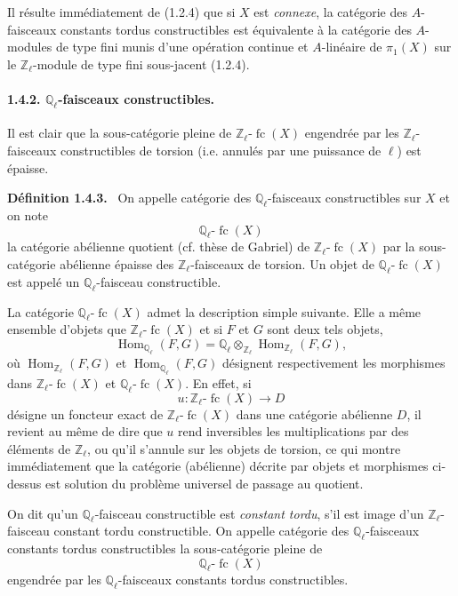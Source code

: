 \documentclass[11pt]{article}
\newenvironment{statement}[1]{\par\medskip\noindent\textbf{#1.}\ }{\par\medskip}
\DeclareMathOperator{\Hom}{Hom}
\providecommand{\Hom}{\operatorname{Hom}}
\providecommand{\fc}{\operatorname{fc}}
\providecommand{\Hom}{\operatorname{Hom}}
\begin{document}
Il résulte immédiatement de (1.2.4) que si \(X\) est \emph{connexe}, la catégorie des \(A\)-faisceaux constants tordus constructibles est équivalente à la catégorie des \(A\)-modules de type fini munis d'une opération continue et \(A\)-linéaire de \(\pi_1(X)\) sur le \(\mathbb Z_\ell\)-module de type fini sous-jacent (1.2.4).

\paragraph{1.4.2. \(\mathbb Q_\ell\)-faisceaux constructibles.}
Il est clair que la sous-catégorie pleine de \(\mathbb Z_\ell\text{-}\fc(X)\) engendrée par les \(\mathbb Z_\ell\)-faisceaux constructibles de torsion (i.e. annulés par une puissance de \(\ell\)) est épaisse.

\begin{statement}{Définition 1.4.3}
On appelle catégorie des \(\mathbb Q_\ell\)-faisceaux constructibles sur \(X\) et on note
\[
\mathbb Q_\ell\text{-}\fc(X)
\]
la catégorie abélienne quotient (cf. thèse de Gabriel) de \(\mathbb Z_\ell\text{-}\fc(X)\) par la sous-catégorie abélienne épaisse des \(\mathbb Z_\ell\)-faisceaux de torsion. Un objet de \(\mathbb Q_\ell\text{-}\fc(X)\) est appelé un \(\mathbb Q_\ell\)-faisceau constructible.
\end{statement}

La catégorie \(\mathbb Q_\ell\text{-}\fc(X)\) admet la description simple suivante. Elle a même ensemble d'objets que \(\mathbb Z_\ell\text{-}\fc(X)\) et si \(F\) et \(G\) sont deux tels objets,
\[
\Hom_{\mathbb Q_\ell}(F,G)
=\mathbb Q_\ell\otimes_{\mathbb Z_\ell}\Hom_{\mathbb Z_\ell}(F,G),
\]
où \(\Hom_{\mathbb Z_\ell}(F,G)\) et \(\Hom_{\mathbb Q_\ell}(F,G)\)
désignent respectivement les morphismes dans \(\mathbb Z_\ell\text{-}\fc(X)\) et \(\mathbb Q_\ell\text{-}\fc(X)\). En effet, si
\[
u:\mathbb Z_\ell\text{-}\fc(X)\longrightarrow D
\]
désigne un foncteur exact de \(\mathbb Z_\ell\text{-}\fc(X)\) dans une catégorie abélienne \(D\), il revient au même de dire que \(u\) rend inversibles les multiplications par des éléments de \(\mathbb Z_\ell\), ou qu'il s'annule sur les objets de torsion, ce qui montre immédiatement que la catégorie (abélienne) décrite par objets et morphismes ci-dessus est solution du problème universel de passage au quotient.

On dit qu'un \(\mathbb Q_\ell\)-faisceau constructible est \emph{constant tordu}, s'il est image d'un \(\mathbb Z_\ell\)-faisceau constant tordu constructible. On appelle catégorie des \(\mathbb Q_\ell\)-faisceaux constants tordus constructibles la sous-catégorie pleine de
\[
\mathbb Q_\ell\text{-}\fc(X)
\]
engendrée par les \(\mathbb Q_\ell\)-faisceaux constants tordus constructibles.
\end{document}
